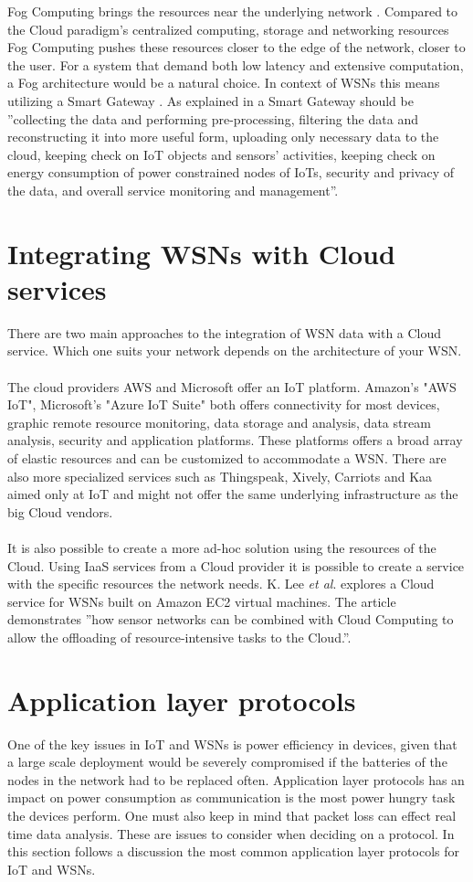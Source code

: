\documentclass[]{uiophd}
\begin{document}
Fog Computing brings the resources near the underlying network \cite{6984239}. Compared to the Cloud paradigm's centralized computing, storage and networking resources Fog Computing pushes these resources closer to the edge of the network, closer to the user. For a system that demand both low latency and extensive computation, a Fog architecture would be a natural choice. In context of WSNs this means utilizing a Smart Gateway \cite{6984239}. As explained in \cite{69842392} a Smart Gateway should be ''collecting the data and performing pre-processing, filtering the data and reconstructing it into more useful form, uploading only necessary data to the cloud, keeping check on IoT objects and sensors’ activities, keeping check on energy consumption of power constrained nodes of IoTs, security and privacy of the data, and overall service monitoring and management''. 

\section{Integrating WSNs with Cloud services}
There are two main approaches to the integration of WSN data with a Cloud service. Which one suits your network depends on the architecture of your WSN.
\\\\
The cloud providers AWS and Microsoft offer an IoT platform. Amazon's "AWS IoT", Microsoft's "Azure IoT Suite" both offers connectivity for most devices, graphic remote resource monitoring, data storage and analysis, data stream analysis, security and application platforms. These platforms offers a broad array of elastic resources and can be customized to accommodate a WSN. There are also more specialized services such as Thingspeak, Xively, Carriots and Kaa aimed only at IoT and might not offer the same underlying infrastructure as the big Cloud vendors.
\\\\
It is also possible to create a more ad-hoc solution using the resources of the Cloud. Using IaaS services from a Cloud provider it is possible to create a service with the specific resources the network needs. K. Lee \textit{et al}. \cite{5678063} explores a Cloud service for WSNs built on Amazon EC2 virtual machines. The article demonstrates ''how sensor networks can be combined with Cloud Computing to allow the offloading of resource-intensive tasks to the Cloud.''\cite{56780637}.

\section{Application layer protocols}
One of the key issues in IoT and WSNs is power efficiency in devices, given that a large scale deployment would be severely compromised if the batteries of the nodes in the network had to be replaced often. Application layer protocols has an impact on power consumption as communication is the most power hungry task the devices perform. One must also keep in mind that packet loss can effect real time data analysis. These are issues to consider when deciding on a protocol. In this section follows a discussion the most common application layer protocols for IoT and WSNs.
\end{document}
